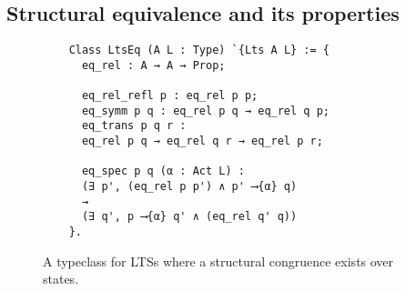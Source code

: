 


\subsection{Structural equivalence and its properties}
\label{sec:equiv}
\label{sec:structural-congruence}


\begin{figure}[t]
  \hrulefill
  \begin{verbatim}
    Class LtsEq (A L : Type) `{Lts A L} := {
      eq_rel : A → A → Prop;

      eq_rel_refl p : eq_rel p p;
      eq_symm p q : eq_rel p q → eq_rel q p;
      eq_trans p q r :
      eq_rel p q → eq_rel q r → eq_rel p r;

      eq_spec p q (α : Act L) :
      (∃ p', (eq_rel p p') ∧ p' ⟶{α} q)
      →
      (∃ q', p ⟶{α} q' ∧ (eq_rel q' q))
    }.
  \end{verbatim}
  \caption{A typeclass for LTSs where a structural congruence exists over states.}
  \label{fig:LtsEq}
  \hrulefill
\end{figure}


